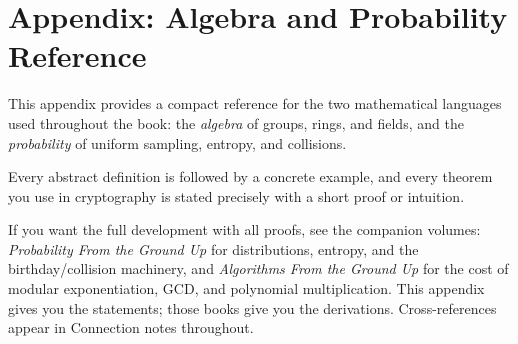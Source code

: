 \chapter{Appendix: Algebra and Probability Reference}

This appendix provides a compact reference for the two mathematical languages used throughout the book: the \emph{algebra} of groups, rings, and fields, and the \emph{probability} of uniform sampling, entropy, and collisions.

Every abstract definition is followed by a concrete example, and every theorem you use in cryptography is stated precisely with a short proof or intuition.

\begin{marginnotebox}
If you want the full development with all proofs, see the companion volumes:
\emph{Probability From the Ground Up} for distributions, entropy, and the
birthday/collision machinery, and \emph{Algorithms From the Ground Up} for the
cost of modular exponentiation, GCD, and polynomial multiplication. This appendix
gives you the statements; those books give you the derivations. Cross-references
appear in Connection notes throughout.
\end{marginnotebox}

\chapterline


